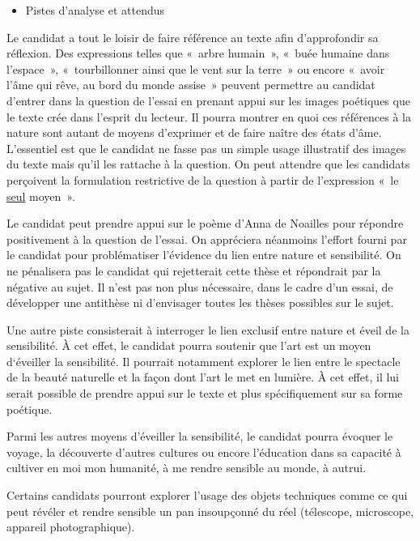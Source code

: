 {\begin{itemize}[label=\textbullet]
\item Pistes d'analyse et attendus
\end{itemize}

Le candidat a tout le loisir de faire référence au texte afin d'approfondir sa réflexion.
Des expressions telles que «~arbre humain~», «~buée humaine dans l'espace~»,
«~tourbillonner ainsi que le vent sur la terre~» ou encore «~avoir l'âme qui rêve, au bord
du monde assise~» peuvent permettre au candidat d'entrer dans la question de l'essai
en prenant appui sur les images poétiques que le texte crée dans l'esprit du lecteur. 
Il
pourra montrer en quoi ces références à la nature sont autant de moyens d'exprimer
et de faire naître des états d'âme. L'essentiel est que le candidat ne fasse pas un
simple usage illustratif des images du texte mais qu'il les rattache à la question.
On peut attendre que les candidats perçoivent la formulation restrictive de la question
à partir de l'expression «~le \underline{seul} moyen~».

Le candidat peut prendre appui sur le poème d'Anna de Noailles pour répondre
positivement à la question de l'essai. On appréciera néanmoins l'effort fourni par le
candidat pour problématiser l'évidence du lien entre nature et sensibilité. On ne
pénalisera pas le candidat qui rejetterait cette thèse et répondrait par la négative au
sujet. Il n'est pas non plus nécessaire, dans le cadre d'un essai, de développer une
antithèse ni d'envisager toutes les thèses possibles sur le sujet.

Une autre piste consisterait à interroger le lien exclusif entre nature et éveil de la
sensibilité. À cet effet, le candidat pourra soutenir que l'art est un moyen d‘éveiller la
sensibilité. Il pourrait notamment explorer le lien entre le spectacle de la beauté
naturelle et la façon dont l'art le met en lumière. À cet effet, il lui serait possible de
prendre appui sur le texte et plus spécifiquement sur sa forme poétique.

Parmi les autres moyens d'éveiller la sensibilité, le candidat pourra évoquer le voyage,
la découverte d'autres cultures ou encore l'éducation dans sa capacité à cultiver en
moi mon humanité, à me rendre sensible au monde, à autrui.

Certains candidats pourront explorer l'usage des objets techniques comme ce qui peut
révéler et rendre sensible un pan insoupçonné du réel (télescope, microscope,
appareil photographique).

}

